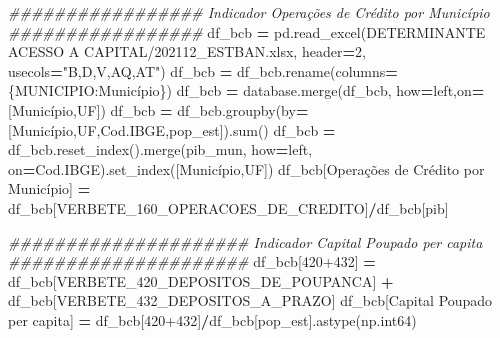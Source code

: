\documentclass[
  12,
  dvipsnames]{article}
\newenvironment{Shaded}{\begin{snugshade}}{\end{snugshade}}
\newcommand{\BuiltInTok}[1]{#1}
\newcommand{\CommentTok}[1]{\textcolor[rgb]{0.56,0.35,0.01}{\textit{#1}}}
\newcommand{\DecValTok}[1]{\textcolor[rgb]{0.00,0.00,0.81}{#1}}
\newcommand{\NormalTok}[1]{#1}
\newcommand{\OperatorTok}[1]{\textcolor[rgb]{0.81,0.36,0.00}{\textbf{#1}}}
\newcommand{\StringTok}[1]{\textcolor[rgb]{0.31,0.60,0.02}{#1}}
\begin{document}
\begin{Shaded}
\begin{Highlighting}[]
\CommentTok{\#\#\#\#\#\#\#\#\#\#\#\#\#\#\#\#\# Indicador Operações de Crédito por Município \#\#\#\#\#\#\#\#\#\#\#\#\#\#\#\#\#}
\NormalTok{df\_bcb }\OperatorTok{=}\NormalTok{ pd.read\_excel(}\StringTok{\textquotesingle{}DETERMINANTE ACESSO A CAPITAL/202112\_ESTBAN.xlsx\textquotesingle{}}\NormalTok{, }
\NormalTok{                       header}\OperatorTok{=}\DecValTok{2}\NormalTok{, usecols}\OperatorTok{=}\StringTok{"B,D,V,AQ,AT"}\NormalTok{)}
\NormalTok{df\_bcb }\OperatorTok{=}\NormalTok{ df\_bcb.rename(columns}\OperatorTok{=}\NormalTok{\{}\StringTok{\textquotesingle{}MUNICIPIO\textquotesingle{}}\NormalTok{:}\StringTok{\textquotesingle{}Município\textquotesingle{}}\NormalTok{\})}
\NormalTok{df\_bcb }\OperatorTok{=}\NormalTok{ database.merge(df\_bcb, how}\OperatorTok{=}\StringTok{\textquotesingle{}left\textquotesingle{}}\NormalTok{,on}\OperatorTok{=}\NormalTok{[}\StringTok{\textquotesingle{}Município\textquotesingle{}}\NormalTok{,}\StringTok{\textquotesingle{}UF\textquotesingle{}}\NormalTok{])}
\NormalTok{df\_bcb }\OperatorTok{=}\NormalTok{ df\_bcb.groupby(by}\OperatorTok{=}\NormalTok{[}\StringTok{\textquotesingle{}Município\textquotesingle{}}\NormalTok{,}\StringTok{\textquotesingle{}UF\textquotesingle{}}\NormalTok{,}\StringTok{\textquotesingle{}Cod.IBGE\textquotesingle{}}\NormalTok{,}\StringTok{\textquotesingle{}pop\_est\textquotesingle{}}\NormalTok{]).}\BuiltInTok{sum}\NormalTok{()}
\NormalTok{df\_bcb }\OperatorTok{=}\NormalTok{ df\_bcb.reset\_index().merge(pib\_mun, how}\OperatorTok{=}\StringTok{\textquotesingle{}left\textquotesingle{}}\NormalTok{, on}\OperatorTok{=}\StringTok{\textquotesingle{}Cod.IBGE\textquotesingle{}}\NormalTok{).set\_index([}\StringTok{\textquotesingle{}Município\textquotesingle{}}\NormalTok{,}\StringTok{\textquotesingle{}UF\textquotesingle{}}\NormalTok{])}
\NormalTok{df\_bcb[}\StringTok{\textquotesingle{}Operações de Crédito por Município\textquotesingle{}}\NormalTok{] }\OperatorTok{=}\NormalTok{ df\_bcb[}\StringTok{\textquotesingle{}VERBETE\_160\_OPERACOES\_DE\_CREDITO\textquotesingle{}}\NormalTok{]}\OperatorTok{/}\NormalTok{df\_bcb[}\StringTok{\textquotesingle{}pib\textquotesingle{}}\NormalTok{]}

\CommentTok{\#\#\#\#\#\#\#\#\#\#\#\#\#\#\#\#\#\#\#\#\# Indicador Capital Poupado per capita \#\#\#\#\#\#\#\#\#\#\#\#\#\#\#\#\#\#\#\#\#}
\NormalTok{df\_bcb[}\StringTok{\textquotesingle{}420+432\textquotesingle{}}\NormalTok{] }\OperatorTok{=}\NormalTok{ df\_bcb[}\StringTok{\textquotesingle{}VERBETE\_420\_DEPOSITOS\_DE\_POUPANCA\textquotesingle{}}\NormalTok{] }\OperatorTok{+}\NormalTok{ df\_bcb[}\StringTok{\textquotesingle{}VERBETE\_432\_DEPOSITOS\_A\_PRAZO\textquotesingle{}}\NormalTok{]}
\NormalTok{df\_bcb[}\StringTok{\textquotesingle{}Capital Poupado per capita\textquotesingle{}}\NormalTok{] }\OperatorTok{=}\NormalTok{ df\_bcb[}\StringTok{\textquotesingle{}420+432\textquotesingle{}}\NormalTok{]}\OperatorTok{/}\NormalTok{df\_bcb[}\StringTok{\textquotesingle{}pop\_est\textquotesingle{}}\NormalTok{].astype(np.int64)}


\end{Highlighting}
\end{Shaded}
\end{document}
